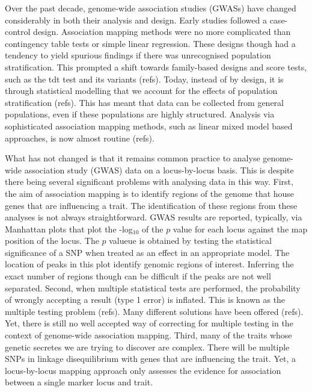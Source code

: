 \documentclass{article}
\begin{document}
Over the past decade,  genome-wide association studies (GWASs) have changed considerably in both their analysis and design. Early studies
 followed a case-control design. Association mapping methods were no more complicated than contingency table tests or simple 
linear regression. These designs though had a tendency to yield spurious findings if there was unrecognised population stratification. This prompted a shift towards family-based designs and score tests, such as the tdt test and its variants (refs). Today, instead of by design, it is through statistical modelling that we account for the effects of population stratification (refs). This has meant that data can be collected from general populations, even if these populations are highly structured. Analysis via sophisticated association mapping methods, such as linear mixed model based approaches,  is now almost routine (refs).

What has not changed is that it remains common practice to analyse genome-wide association study (GWAS) data on a locus-by-locus basis. This is despite there being several significant problems with analysing data in this way. 
First, the aim of association mapping is to identify regions of the genome that house genes that are influencing a trait. 
The identification of these regions from these analyses is not always straightforward. GWAS results are reported, typically, via Manhattan plots 
that plot the -log$_{10}$ of the $p$ value for each locus against the map position of the locus. The $p$ valueue is obtained by testing the statistical 
significance of a SNP when treated as an effect in an appropriate model. 
The location of peaks in this plot identify genomic 
regions of interest. Inferring the exact number of regions though can be difficult if the peaks are not well separated. Second, when multiple statistical tests are performed, the probability of wrongly accepting a result (type 1 error) is inflated. This is known as the multiple testing problem (refs). Many different solutions have been offered (refs). Yet, there is still no well accepted way of correcting for multiple testing in the context of genome-wide association mapping. Third, many of the traits whose genetic secretes we are trying to discover are complex. There will be multiple SNPs in linkage disequilibrium with genes that are influencing the trait. Yet, a locus-by-locus mapping approach only assesses the evidence for association between a single marker locus and trait.
\end{document}
